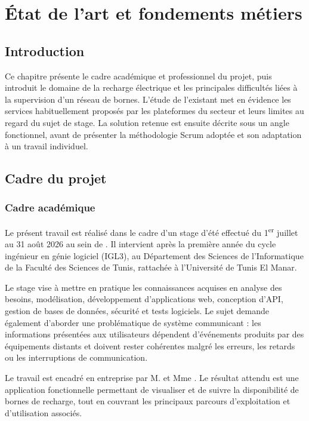 \chapter{État de l'art et fondements métiers}

\section*{Introduction}

Ce chapitre présente le cadre académique et professionnel du projet, puis introduit
le domaine de la recharge électrique et les principales difficultés liées à la
supervision d'un réseau de bornes. L'étude de l'existant met en évidence les services
habituellement proposés par les plateformes du secteur et leurs limites au regard
du sujet de stage. La solution retenue est ensuite décrite sous un angle fonctionnel,
avant de présenter la méthodologie Scrum adoptée et son adaptation à un travail
individuel.

\section{Cadre du projet}

\subsection{Cadre académique}

Le présent travail est réalisé dans le cadre d'un stage d'été effectué du
1\textsuperscript{er} juillet au 31 août 2026 au sein de \CompanyName{}. Il intervient
après la première année du cycle ingénieur en génie logiciel (IGL3), au Département
des Sciences de l'Informatique de la Faculté des Sciences de Tunis, rattachée à
l'Université de Tunis El Manar.

Le stage vise à mettre en pratique les connaissances acquises en analyse des besoins,
modélisation, développement d'applications web, conception d'API, gestion de bases de
données, sécurité et tests logiciels. Le sujet demande également d'aborder une
problématique de système communicant : les informations présentées aux utilisateurs
dépendent d'événements produits par des équipements distants et doivent rester
cohérentes malgré les erreurs, les retards ou les interruptions de communication.

Le travail est encadré en entreprise par M. \CompanySupervisor{} et Mme
\CompanyCoSupervisor{}. Le résultat attendu est une application fonctionnelle permettant de visualiser et de suivre la
disponibilité de bornes de recharge, tout en couvrant les principaux parcours
d'exploitation et d'utilisation associés.

